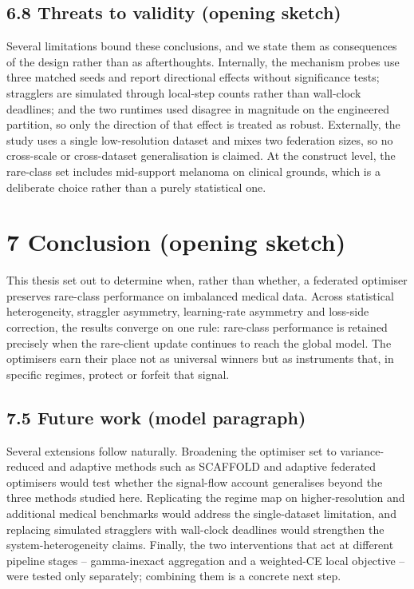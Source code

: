 \subsection*{6.8 Threats to validity (opening sketch)}
Several limitations bound these conclusions, and we state them as consequences of
the design rather than as afterthoughts. Internally, the mechanism probes use
three matched seeds and report directional effects without significance tests;
stragglers are simulated through local-step counts rather than wall-clock
deadlines; and the two runtimes used disagree in magnitude on the engineered
partition, so only the direction of that effect is treated as robust.
Externally, the study uses a single low-resolution dataset and mixes two
federation sizes, so no cross-scale or cross-dataset generalisation is claimed.
At the construct level, the rare-class set includes mid-support melanoma on
clinical grounds, which is a deliberate choice rather than a purely statistical
one.


\section*{7 Conclusion (opening sketch)}
This thesis set out to determine when, rather than whether, a federated optimiser
preserves rare-class performance on imbalanced medical data. Across statistical
heterogeneity, straggler asymmetry, learning-rate asymmetry and loss-side
correction, the results converge on one rule: rare-class performance is retained
precisely when the rare-client update continues to reach the global model. The
optimisers earn their place not as universal winners but as instruments that, in
specific regimes, protect or forfeit that signal.


\subsection*{7.5 Future work (model paragraph)}
Several extensions follow naturally. Broadening the optimiser set to variance-
reduced and adaptive methods such as SCAFFOLD \citep{karimireddy2020scaffold} and
adaptive federated optimisers \citep{reddi2021adaptive} would test whether the
signal-flow account generalises beyond the three methods studied here.
Replicating the regime map on higher-resolution and additional medical benchmarks
would address the single-dataset limitation, and replacing simulated stragglers
with wall-clock deadlines would strengthen the system-heterogeneity claims.
Finally, the two interventions that act at different pipeline stages --
gamma-inexact aggregation and a weighted-CE local objective -- were tested only
separately; combining them is a concrete next step.
